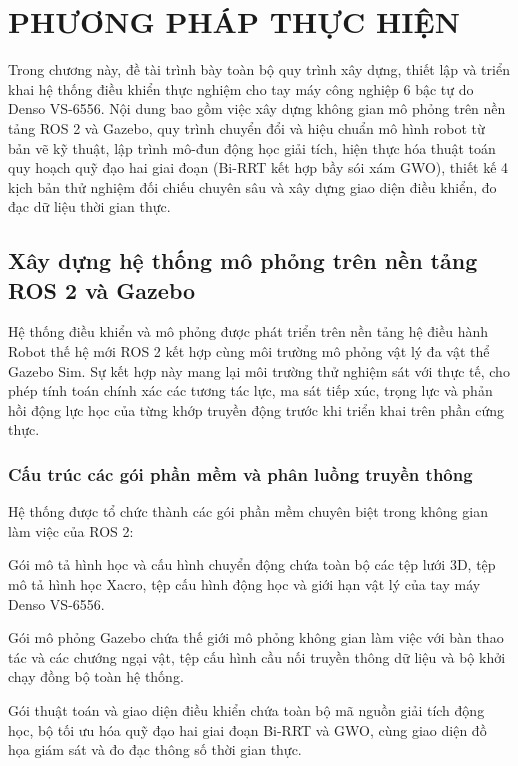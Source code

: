\chapter{PHƯƠNG PHÁP THỰC HIỆN}
\label{chap:phuong_phap_thuc_hien}

Trong chương này, đề tài trình bày toàn bộ quy trình xây dựng, thiết lập và triển khai hệ thống điều khiển thực nghiệm cho tay máy công nghiệp 6 bậc tự do Denso VS-6556. Nội dung bao gồm việc xây dựng không gian mô phỏng trên nền tảng ROS 2 và Gazebo, quy trình chuyển đổi và hiệu chuẩn mô hình robot từ bản vẽ kỹ thuật, lập trình mô-đun động học giải tích, hiện thực hóa thuật toán quy hoạch quỹ đạo hai giai đoạn (Bi-RRT kết hợp bầy sói xám GWO), thiết kế 4 kịch bản thử nghiệm đối chiếu chuyên sâu và xây dựng giao diện điều khiển, đo đạc dữ liệu thời gian thực.

\section{Xây dựng hệ thống mô phỏng trên nền tảng ROS 2 và Gazebo}
\label{sec:ros2_gazebo_setup}

Hệ thống điều khiển và mô phỏng được phát triển trên nền tảng hệ điều hành Robot thế hệ mới ROS 2 kết hợp cùng môi trường mô phỏng vật lý đa vật thể Gazebo Sim. Sự kết hợp này mang lại môi trường thử nghiệm sát với thực tế, cho phép tính toán chính xác các tương tác lực, ma sát tiếp xúc, trọng lực và phản hồi động lực học của từng khớp truyền động trước khi triển khai trên phần cứng thực.

\subsection{Cấu trúc các gói phần mềm và phân luồng truyền thông}

Hệ thống được tổ chức thành các gói phần mềm chuyên biệt trong không gian làm việc của ROS 2:

Gói mô tả hình học và cấu hình chuyển động chứa toàn bộ các tệp lưới 3D, tệp mô tả hình học Xacro, tệp cấu hình động học và giới hạn vật lý của tay máy Denso VS-6556.

Gói mô phỏng Gazebo chứa thế giới mô phỏng không gian làm việc với bàn thao tác và các chướng ngại vật, tệp cấu hình cầu nối truyền thông dữ liệu và bộ khởi chạy đồng bộ toàn hệ thống.

Gói thuật toán và giao diện điều khiển chứa toàn bộ mã nguồn giải tích động học, bộ tối ưu hóa quỹ đạo hai giai đoạn Bi-RRT và GWO, cùng giao diện đồ họa giám sát và đo đạc thông số thời gian thực.

